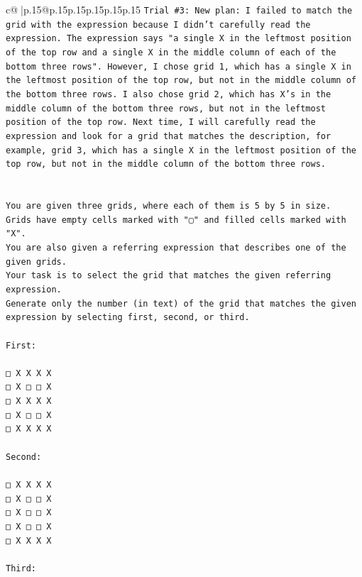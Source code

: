 \documentclass{article}
\begin{document}
{\begin{supertabular}{c@{$\;$}|p{.15\linewidth}@{}p{.15\linewidth}p{.15\linewidth}p{.15\linewidth}p{.15\linewidth}p{.15\linewidth}}
{{{\texttt{Trial \#3: New plan: I failed to match the grid with the expression because I didn't carefully read the expression. The expression says "a single X in the leftmost position of the top row and a single X in the middle column of each of the bottom three rows". However, I chose grid 1, which has a single X in the leftmost position of the top row, but not in the middle column of the bottom three rows. I also chose grid 2, which has X's in the middle column of the bottom three rows, but not in the leftmost position of the top row. Next time, I will carefully read the expression and look for a grid that matches the description, for example, grid 3, which has a single X in the leftmost position of the top row, but not in the middle column of the bottom three rows.} \\
\\ 
\\ 
\texttt{You are given three grids, where each of them is 5 by 5 in size.} \\
\texttt{Grids have empty cells marked with "▢" and filled cells marked with "X".} \\
\texttt{You are also given a referring expression that describes one of the given grids.} \\
\texttt{Your task is to select the grid that matches the given referring expression.} \\
\texttt{Generate only the number (in text) of the grid that matches the given expression by selecting first, second, or third.} \\
\\ 
\texttt{First:} \\
\\ 
\texttt{□ X X X X} \\
\texttt{□ X □ □ X} \\
\texttt{□ X X X X} \\
\texttt{□ X □ □ X} \\
\texttt{□ X X X X} \\
\\ 
\texttt{Second:} \\
\\ 
\texttt{□ X X X X} \\
\texttt{□ X □ □ X} \\
\texttt{□ X □ □ X} \\
\texttt{□ X □ □ X} \\
\texttt{□ X X X X} \\
\\ 
\texttt{Third:} \\
}}}
\end{supertabular}}
\end{document}
